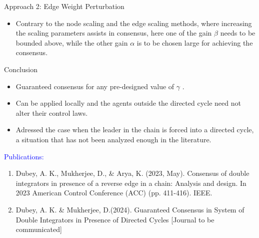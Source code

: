 \begin{frame}{Approach 2: Edge Weight Perturbation}
\begin{itemize}
		\item Contrary to the node scaling and the edge scaling methods, where increasing the scaling parameters assists in consensus, here one of the gain $\beta$ needs to be bounded above, while the other gain $\alpha$ is to be chosen large for achieving the consensus.
	\end{itemize}
\end{frame}
\begin{frame}
	\begin{block}{Conclusion}
		\begin{itemize}
			\item Guaranteed consensus for any pre-designed value of $\gamma$ .
			\item Can be applied locally and the agents outside the directed cycle need not alter their control laws.
			\item Adressed the case when the leader in the chain is forced into a directed cycle, a situation that has not been analyzed enough in the literature.
		\end{itemize}
	\end{block}
	\textcolor{blue}{Publications: }\\
	\begin{enumerate}
		\item Dubey, A. K., Mukherjee, D., \& Arya, K. (2023, May). Consensus of double integrators in presence of a reverse edge in a chain: Analysis and design. In 2023 American Control Conference (ACC) (pp. 411-416). IEEE.
		\item Dubey, A. K. \& Mukherjee, D.(2024). Guaranteed Consensus in System of Double Integrators in Presence of Directed Cycles [Journal to be communicated]
	\end{enumerate}
\end{frame}

